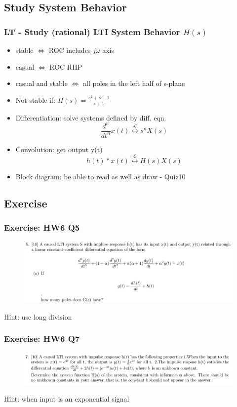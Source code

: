 \documentclass{beamer}
\begin{document}
\subsection{Study System Behavior}
\begin{frame}
    \frametitle{LT - Study (rational) LTI System Behavior $H(s)$ }
    \begin{itemize}
        \item stable $\Longleftrightarrow$ ROC includes $j\omega$ axis
        \item casual $\Longleftrightarrow$ ROC RHP
        \item casual and stable $\Longleftrightarrow$ all poles in the left half of s-plane
        \item Not stable if: $H(s) = \frac{s^2+s+1}{s+1}$
        \item Differentiation: solve systems defined by diff. eqn. \[ \frac{d^n}{dt^n} x(t) \stackrel{\mathscr{L}}{\longleftrightarrow} s^n X(s) \]
        \item Convolution: get output y(t) \[h(t)* x(t) \stackrel{\mathscr{L}}{\longleftrightarrow} H(s) X(s)    \]
        \item Block diagram: be able to read as well as draw - Quiz10
    \end{itemize}
\end{frame}

\subsection{Exercise}

\begin{frame}[t]
    \frametitle{Exercise: HW6 Q5}
    \begin{figure}
        \includegraphics[width=1\linewidth]{q5}
    \end{figure}
    Hint: use long division
\end{frame}

\begin{frame}[t]
    \frametitle{Exercise: HW6 Q7}
    \begin{figure}
        \includegraphics[width=1\linewidth]{q7}
    \end{figure}
    Hint: when input is an exponential signal
\end{frame}
\end{document}
